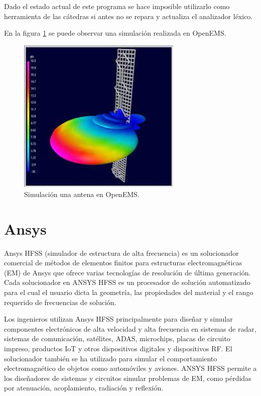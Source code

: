 \documentclass[
    11pt,
    spanish,
    a4paper
]{article}
\begin{document}
Dado el estado actual de este programa se hace imposible utilizarlo como herramienta de las cátedras si antes no se repara y actualiza el analizador léxico.

En la figura \ref{fig:openems} se puede observar una simulación realizada en OpenEMS.

\begin{figure}[htbp]
	\centering
	\includegraphics[width=0.7\textwidth]{img/openems.jpeg}
	\caption{Simulación una antena en OpenEMS.}
	\label{fig:openems}
\end{figure}

\newpage

\section{Ansys}

Ansys HFSS (simulador de estructura de alta frecuencia) es un solucionador comercial de métodos de elementos finitos para estructuras electromagnéticas (EM) de Ansys que ofrece varias tecnologías de resolución de última generación.
Cada solucionador en ANSYS HFSS es un procesador de solución automatizado para el cual el usuario dicta la geometría, las propiedades del material y el rango requerido de frecuencias de solución.

Los ingenieros utilizan Ansys HFSS principalmente para diseñar y simular componentes electrónicos de alta velocidad y alta frecuencia en sistemas de radar, sistemas de comunicación, satélites, ADAS, microchips, placas de circuito impreso, productos IoT y otros dispositivos digitales y dispositivos RF.
El solucionador también se ha utilizado para simular el comportamiento electromagnético de objetos como automóviles y aviones.
ANSYS HFSS permite a los diseñadores de sistemas y circuitos simular problemas de EM, como pérdidas por atenuación, acoplamiento, radiación y reflexión.
\end{document}
